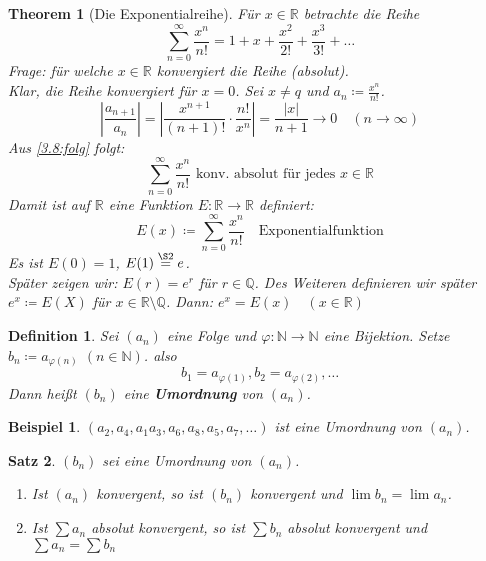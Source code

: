 \documentclass[14pt,titlepage,ngerman,a4paper,headsepline,DIV15,halfparskip*]{scrartcl}
\newcommand{\N}{\mathbb{N}}
\newcommand{\Q}{\mathbb{Q}}
\newcommand{\R}{\mathbb{R}}
\theoremstyle{named}
\newtheorem{namedtheorem}{Theorem} \counterwithin{namedtheorem}{section}
\theoremstyle{dotless}
\newtheorem{satz}[namedtheorem]{Satz}
\newtheorem*{beispiel*}{Beispiel}
\newtheorem*{definition}{Definition}
\begin{document}
 
\begin{namedtheorem}[Die Exponentialreihe] \label{3.9:prop-Exponentialreihe}
	Für $x \in \R$ betrachte die Reihe 
	$$ \sum_{n=0}^{\infty} \frac{x^{n}}{n!} = 1 + x + \frac{x^{2}}{2!} + \frac{x^{3}}{3!} + \dotsc $$
	Frage: für welche $x \in \R$ konvergiert die Reihe (absolut). \\
	Klar, die Reihe konvergiert für $x = 0$. Sei $x \ne q$ und $a_{n} \coloneqq \frac{x^{n}}{n!}$.
		$$ \left| \frac{a_{n+1}}{a_{n}} \right| = \left| \frac{x^{n+1}}{(n+1)!} \cdot \frac{n!}{x^{n}} \right| = \frac{|x|}{n+1} \rightarrow 0 \quad (n \rightarrow \infty) $$
	Aus \ref{3.8:folg} folgt:
		$$ \sum_{n=0}^{\infty} \frac{x^{n}}{n!} \text{ konv. absolut für jedes } x \in \R $$
	Damit ist auf $\R$ eine Funktion $E \colon \R \rightarrow \R$ definiert:
		$$ E(x) \coloneqq \sum_{n=0}^{\infty} \frac{x^{n}}{n!} \quad \text{Exponentialfunktion} $$
	Es ist $E(0) = 1$, $E(1) \overset{\S 2}{=} e$. \\
	Später zeigen wir: $E(r) = e^{r}$ für $r \in \Q$. Des Weiteren definieren wir später $e^{x} \coloneqq E(X)$ für $x \in \R \setminus \Q$. Dann: $e^{x} = E(x) \quad (x \in \R)$
\end{namedtheorem}

\begin{definition}
	Sei $(a_{n})$ eine Folge und $\varphi \colon \N \rightarrow \N$ eine Bijektion. Setze $b_{n} \coloneqq a_{\varphi(n)}$ $(n \in \N)$. also 
		$$ b_{1} = a_{\varphi(1)}, b_{2} = a_{\varphi(2)}, \dotsc $$
	Dann hei{\ss}t $(b_{n})$ eine \textbf{Umordnung} von $(a_{n})$.
\end{definition}

\begin{beispiel*}
$(a_{2}, a_{4}, a_{1} a_{3}, a_{6}, a_{8}, a_{5}, a_{7}, \dotsc)$ ist eine Umordnung von $(a_{n})$.	
\end{beispiel*}


\begin{satz} \label{3.10:satz}
	$(b_{n})$ sei eine Umordnung von $(a_{n})$.
	\begin{enumerate}
		\item Ist $(a_{n})$ konvergent, so ist $(b_{n})$ konvergent und $\lim b_{n} = \lim a_{n}$.
		\item Ist $\sum a_{n}$ absolut konvergent, so ist $\sum b_{n}$ absolut konvergent und $\sum a_{n} = \sum b_{n}$
	\end{enumerate}	
\end{satz}
\end{document}
